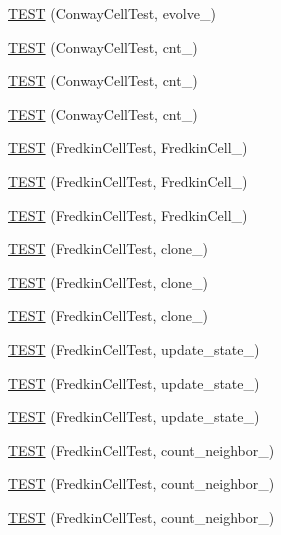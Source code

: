 \begin{DoxyCompactItemize}
\item 
\hyperlink{TestLife_8c_09_09_a80fb6e10fd5668c1cd81b97d12c09a14}{T\-E\-S\-T} (Conway\-Cell\-Test, evolve\-\_)
\item 
\hyperlink{TestLife_8c_09_09_a7c2820a63bef2190a09cf5943a7d1369}{T\-E\-S\-T} (Conway\-Cell\-Test, cnt\-\_)
\item 
\hyperlink{TestLife_8c_09_09_a0cb7b62f6369fb26d9ca20ddd0ab11d9}{T\-E\-S\-T} (Conway\-Cell\-Test, cnt\-\_)
\item 
\hyperlink{TestLife_8c_09_09_a54631ef76d5fa164a509eca13075f8f4}{T\-E\-S\-T} (Conway\-Cell\-Test, cnt\-\_)
\item 
\hyperlink{TestLife_8c_09_09_aaed9491d158b24f612427ea2543a7989}{T\-E\-S\-T} (Fredkin\-Cell\-Test, Fredkin\-Cell\-\_)
\item 
\hyperlink{TestLife_8c_09_09_af6d64bf9c56022384a134561bc37d263}{T\-E\-S\-T} (Fredkin\-Cell\-Test, Fredkin\-Cell\-\_)
\item 
\hyperlink{TestLife_8c_09_09_ac1e8996173f78fce62c1f07d8c8801c2}{T\-E\-S\-T} (Fredkin\-Cell\-Test, Fredkin\-Cell\-\_)
\item 
\hyperlink{TestLife_8c_09_09_a7a39c3af4997e32393027d9a3ec92f3a}{T\-E\-S\-T} (Fredkin\-Cell\-Test, clone\-\_)
\item 
\hyperlink{TestLife_8c_09_09_ad3b13f2af99d56625ba7c51f353f128b}{T\-E\-S\-T} (Fredkin\-Cell\-Test, clone\-\_)
\item 
\hyperlink{TestLife_8c_09_09_a8327a151c8f4ed71692d6cfcc14e3474}{T\-E\-S\-T} (Fredkin\-Cell\-Test, clone\-\_)
\item 
\hyperlink{TestLife_8c_09_09_ad74658aa822578740613105770c4e51b}{T\-E\-S\-T} (Fredkin\-Cell\-Test, update\-\_\-state\-\_)
\item 
\hyperlink{TestLife_8c_09_09_a0f4155feef1f973016c40799a418d04b}{T\-E\-S\-T} (Fredkin\-Cell\-Test, update\-\_\-state\-\_)
\item 
\hyperlink{TestLife_8c_09_09_a2abebdd32fee845c83847f0748f345ae}{T\-E\-S\-T} (Fredkin\-Cell\-Test, update\-\_\-state\-\_)
\item 
\hyperlink{TestLife_8c_09_09_ae4e6eaf16d919efccd4101821514ff2d}{T\-E\-S\-T} (Fredkin\-Cell\-Test, count\-\_\-neighbor\-\_)
\item 
\hyperlink{TestLife_8c_09_09_a9ca7691beaaa37e9aecedb8df36dc70a}{T\-E\-S\-T} (Fredkin\-Cell\-Test, count\-\_\-neighbor\-\_)
\item 
\hyperlink{TestLife_8c_09_09_aa8e45f80d546174d42b14ded97fd04f4}{T\-E\-S\-T} (Fredkin\-Cell\-Test, count\-\_\-neighbor\-\_)

\end{DoxyCompactItemize}
